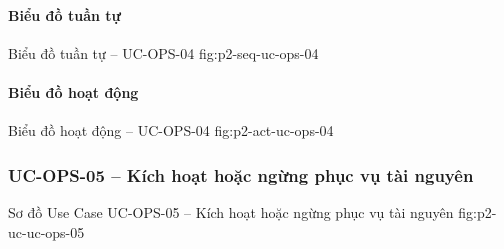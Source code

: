 \clearpage
\paragraph{Biểu đồ tuần tự}
  {Biểu đồ tuần tự -- UC-OPS-04}
  {fig:p2-seq-uc-ops-04}

\clearpage
\paragraph{Biểu đồ hoạt động}
  {Biểu đồ hoạt động -- UC-OPS-04}
  {fig:p2-act-uc-ops-04}

\clearpage
\subsubsection{UC-OPS-05 -- Kích hoạt hoặc ngừng phục vụ tài nguyên}

  {Sơ đồ Use Case UC-OPS-05 -- Kích hoạt hoặc ngừng phục vụ tài nguyên}
  {fig:p2-uc-uc-ops-05}


